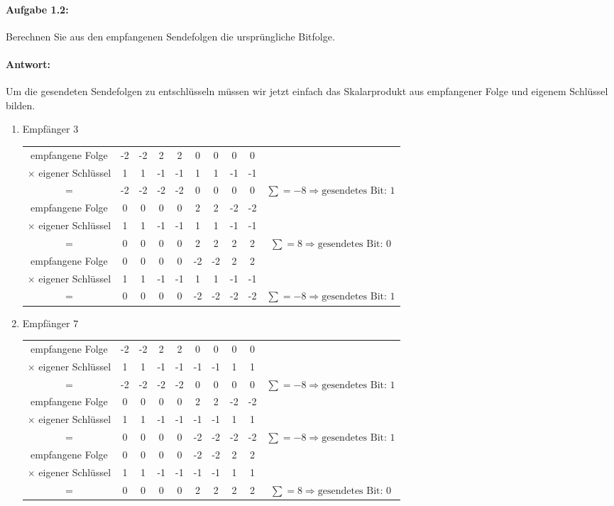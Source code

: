 \paragraph{Aufgabe 1.2:}
	Berechnen Sie aus den empfangenen Sendefolgen die ursprüngliche Bitfolge.
\paragraph{Antwort:} Um die gesendeten Sendefolgen zu entschlüsseln müssen wir jetzt einfach das Skalarprodukt aus empfangener Folge und eigenem Schlüssel bilden.
	\begin{enumerate}
		\item Empfänger $3$
		
			\begin{tabular}{|c|c|c|c|c|c|c|c|c|c|}
			\hline empfangene Folge & -2 & -2 & 2 & 2 & 0 & 0 & 0 & 0 &  \\ 
			$\times$ eigener Schlüssel & 1 & 1 & -1 & -1 & 1 & 1 & -1 & -1 &  \\ 
			= & -2 & -2 & -2 & -2 & 0 & 0 & 0 & 0 & $\sum = -8 \Rightarrow \text{gesendetes Bit: 1}$ \\ 
			\hline empfangene Folge & 0 & 0 & 0 & 0 & 2 & 2 & -2 & -2 &  \\ 
			$\times$ eigener Schlüssel & 1 & 1 & -1 & -1 & 1 & 1 & -1 & -1 &  \\ 
			= & 0 & 0 & 0 & 0 & 2 & 2 & 2 & 2 & $\sum = 8 \Rightarrow \text{gesendetes Bit: 0}$ \\ 
			\hline empfangene Folge & 0 & 0 & 0 & 0 & -2 & -2 & 2 & 2 &  \\ 
			$\times$ eigener Schlüssel & 1 & 1 & -1 & -1 & 1 & 1 & -1 & -1 &  \\ 
			= & 0 & 0 & 0 & 0 & -2 & -2 & -2 & -2 & $\sum = -8 \Rightarrow \text{gesendetes Bit: 1}$ \\ 
			\hline 
			\end{tabular} 
		
		\item Empfänger $7$	
		
			\begin{tabular}{|c|c|c|c|c|c|c|c|c|c|}
			\hline empfangene Folge & -2 & -2 & 2 & 2 & 0 & 0 & 0 & 0 &  \\ 
			$\times$ eigener Schlüssel & 1 & 1 & -1 & -1 & -1 & -1 & 1 & 1 &  \\ 
			= & -2 & -2 & -2 & -2 & 0 & 0 & 0 & 0 & $\sum = -8 \Rightarrow \text{gesendetes Bit: 1}$ \\ 
			\hline empfangene Folge & 0 & 0 & 0 & 0 & 2 & 2 & -2 & -2 &  \\ 
			$\times$ eigener Schlüssel & 1 & 1 & -1 & -1 & -1 & -1 & 1 & 1 &  \\ 
			= & 0 & 0 & 0 & 0 & -2 & -2 & -2 & -2 & $\sum = -8 \Rightarrow \text{gesendetes Bit: 1}$ \\ 
			\hline empfangene Folge & 0 & 0 & 0 & 0 & -2 & -2 & 2 & 2 &  \\
			$\times$ eigener Schlüssel & 1 & 1 & -1 & -1 & -1 & -1 & 1 & 1 &  \\ 
			= & 0 & 0 & 0 & 0 & 2 & 2 & 2 & 2 & $\sum = 8 \Rightarrow \text{gesendetes Bit: 0}$ \\ 
			\hline 
			\end{tabular} 
		
	\end{enumerate}